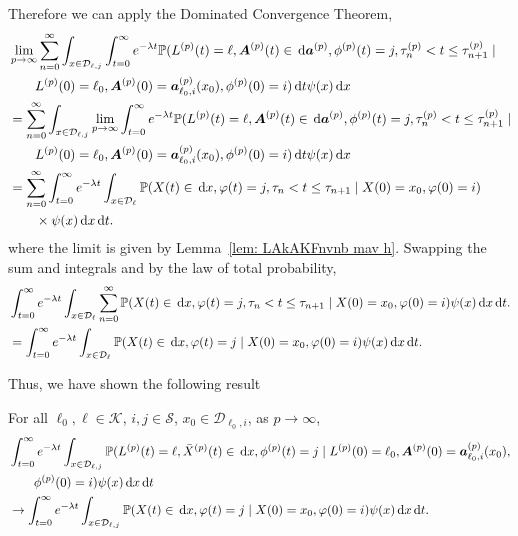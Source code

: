 Therefore we can apply the Dominated Convergence Theorem, 
\begin{align}
	&\lim_{p\to\infty} \sum_{n=0}^\infty\int_{x\in\mathcal D_{\ell,j}}\int_{t=0}^\infty e^{-\lambda t} \mathbb P(L^{(p)}(t) = \ell, \boldsymbol A^{(p)}(t) \in \, \mathrm{d} \boldsymbol a^{(p)}, \phi^{(p)}(t) = j, \tau_{n}^{(p)}< t \leq\tau_{n+1}^{(p)} \mid \nonumber 
	\\&\qquad{}L^{(p)}(0)=\ell_0, \boldsymbol A^{(p)}(0)=\boldsymbol  a_{\ell_0,i}^{(p)}(x_0), \phi^{(p)}(0)=i)\, \mathrm{d} t \psi(x) \, \mathrm{d} x \nonumber
	\\&= \sum_{n=0}^\infty\int_{x\in\mathcal D_{\ell,j}}\lim_{p\to\infty} \int_{t=0}^\infty e^{-\lambda t} \mathbb P(L^{(p)}(t) = \ell, \boldsymbol A^{(p)}(t) \in \, \mathrm{d} \boldsymbol a^{(p)}, \phi^{(p)}(t) = j, \tau_{n}^{(p)}< t \leq\tau_{n+1}^{(p)} \mid \nonumber 
	\\&\qquad{}L^{(p)}(0)=\ell_0, \boldsymbol A^{(p)}(0)=\boldsymbol  a_{\ell_0,i}^{(p)}(x_0), \phi^{(p)}(0)=i)\, \mathrm{d} t \psi(x) \, \mathrm{d} x \nonumber
	\\&= \sum_{n=0}^\infty\int_{t=0}^\infty e^{-\lambda t}  \int_{x\in\mathcal{D}_\ell}\mathbb P(X(t)\in\, \mathrm{d} x, \varphi(t)=j, \tau_n < t \leq \tau_{n+1}  
	\mid X(0)=x_0, \varphi(0)=i) \nonumber 
	\\&\qquad{}\times \psi(x)\, \mathrm{d} x\, \mathrm{d} t. \nonumber
\end{align}
where the limit is given by Lemma~\ref{lem: LAkAKFnvnb mav h}. Swapping the sum and integrals and by the law of total probability, 
\begin{align}
	& \int_{t=0}^\infty e^{-\lambda t}  \int_{x\in\mathcal{D}_\ell}\sum_{n=0}^\infty\mathbb P(X(t)\in\, \mathrm{d} x, \varphi(t)=j, \tau_n < t \leq \tau_{n+1}  
	\mid X(0)=x_0, \varphi(0)=i)\psi(x)\, \mathrm{d} x\, \mathrm{d} t. \nonumber
	\\&= \int_{t=0}^\infty e^{-\lambda t}  \int_{x\in\mathcal{D}_\ell} \mathbb P(X(t)\in\, \mathrm{d} x, \varphi(t)=j  
	\mid X(0)=x_0, \varphi(0)=i)\psi(x)\, \mathrm{d} x\, \mathrm{d} t. \nonumber
\end{align}

Thus, we have shown the following result
\begin{lem}\label{lem: KajPOw}
	For all \(\ell_0,\ell\in\mathcal K\), \(i,j\in\mathcal S\), \(x_0\in\mathcal D_{\ell_0,i}\), as \(p\to\infty\), 
	\begin{align}
		&\int_{t=0}^\infty e^{-\lambda t}\int_{x\in\mathcal D_{\ell,j}}\mathbb P(L^{(p)}(t) = \ell, \bar X^{(p)}(t) \in \, \mathrm{d} x, \phi^{(p)}(t) = j \mid L^{(p)}(0)=\ell_0, \boldsymbol A^{(p)}(0)=\boldsymbol  a_{\ell_0,i}^{(p)}(x_0), \nonumber 
	\\&\qquad{}\phi^{(p)}(0)=i)  \psi(x)\, \mathrm{d} x\, \mathrm{d} t \nonumber
		\\&\to \int_{t=0}^\infty e^{-\lambda t}  \int_{x\in\mathcal{D}_{\ell,j}} \mathbb P(X(t)\in\, \mathrm{d} x, \varphi(t)=j  
		\mid X(0)=x_0, \varphi(0)=i)\psi(x)\, \mathrm{d} x\, \mathrm{d} t. \nonumber
	\end{align}
\end{lem}

